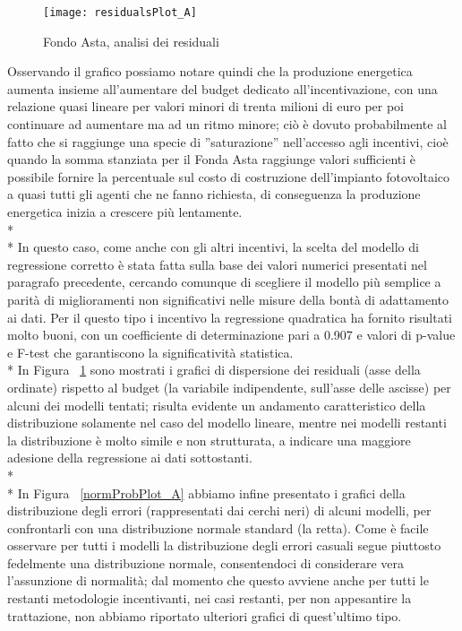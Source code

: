 \documentclass[12pt,a4paper,openright,twoside]{report}
\begin{document}
\begin{figure}[hbt]
	\centering
	\texttt{[image: residualsPlot\_A]}
	\caption{Fondo Asta, analisi dei residuali}
	\label{residualsPlot_A}
\end{figure}

Osservando il grafico possiamo notare quindi che la produzione energetica aumenta insieme all'aumentare del budget dedicato all'incentivazione, con una relazione quasi lineare per valori minori di trenta milioni di euro per poi continuare ad aumentare ma ad un ritmo minore; ciò è dovuto probabilmente al fatto che si raggiunge una specie di ''saturazione'' nell'accesso agli incentivi, cioè quando la somma stanziata per il Fonda Asta raggiunge valori sufficienti è possibile fornire la percentuale sul costo di costruzione dell'impianto fotovoltaico a quasi tutti gli agenti che ne fanno richiesta, di conseguenza la produzione energetica inizia a crescere più lentamente.\\* \\*
In questo caso, come anche con gli altri incentivi, la scelta del modello di regressione corretto è stata fatta sulla base dei valori numerici presentati nel paragrafo precedente, cercando comunque di scegliere il modello più semplice a parità di miglioramenti non significativi nelle misure della bontà di adattamento ai dati. Per il questo tipo i incentivo la regressione quadratica ha fornito risultati molto buoni, con un coefficiente di determinazione pari a 0.907 e valori di p-value e F-test che garantiscono la significatività statistica.\\*
In Figura ~\ref{residualsPlot_A} sono mostrati i grafici di dispersione dei residuali (asse della ordinate) rispetto al budget (la variabile indipendente, sull'asse delle ascisse) per alcuni dei modelli tentati; risulta evidente un andamento caratteristico della distribuzione solamente nel caso del modello lineare, mentre nei modelli restanti la distribuzione è molto simile e non strutturata, a indicare una maggiore adesione della regressione ai dati sottostanti.\\* \\*
In Figura ~\ref{normProbPlot_A} abbiamo infine presentato i grafici della distribuzione degli errori (rappresentati dai cerchi neri) di alcuni modelli, per confrontarli con una distribuzione normale standard (la retta). Come è facile osservare per tutti i modelli la distribuzione degli errori casuali segue piuttosto fedelmente una distribuzione normale, consentendoci di considerare vera l'assunzione di normalità; dal momento che questo avviene anche per tutti le restanti metodologie incentivanti, nei casi restanti, per non appesantire la trattazione, non abbiamo riportato ulteriori grafici di quest'ultimo tipo. 
\end{document}
